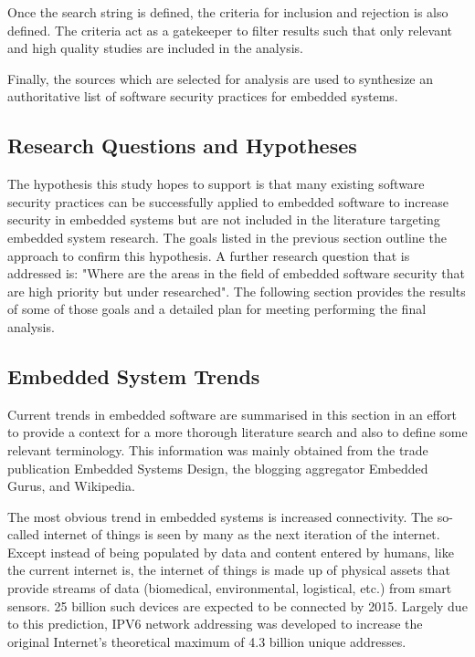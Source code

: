 \documentclass[final]{article}
\begin{document}
Once the search string is defined, the criteria for inclusion and rejection is also defined.  The criteria act as a gatekeeper to filter results such that only relevant and high quality studies are included in the analysis.

Finally, the sources which are selected for analysis are used to synthesize an authoritative list of software security practices for embedded systems.  

\subsection{Research Questions and Hypotheses}

The hypothesis this study hopes to support is that many existing software security practices can be successfully applied to embedded software to increase security in embedded systems but are not included in the literature targeting embedded system research.  The goals listed in the previous section outline the approach to confirm this hypothesis.  A further research question that is addressed is: "Where are the areas in the field of embedded software security that are high priority but under researched". The following section provides the results of some of those goals and a detailed plan for meeting performing the final analysis.

\subsection{Embedded System Trends}

Current trends in embedded software are summarised in this section in an effort to provide a context for a more thorough literature search and also to define some relevant terminology.  This information was mainly obtained from the trade publication Embedded Systems Design, the blogging aggregator Embedded Gurus, and Wikipedia.  

The most obvious trend in embedded systems is increased connectivity.  The so-called internet of things is seen by many as the next iteration of the internet. Except instead of being populated by data and content entered by humans, like the current internet is, the internet of things is made up of physical assets that provide streams of data (biomedical, environmental, logistical, etc.) from smart sensors.  25 billion such devices are expected to be connected by 2015. Largely due to this prediction, IPV6 network addressing was developed to increase the original Internet’s theoretical maximum of 4.3 billion unique addresses.  
\end{document}
